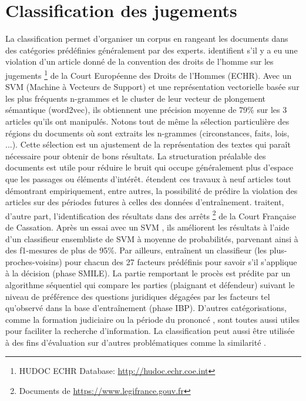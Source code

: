 \section{Classification des jugements}
La classification permet d'organiser un corpus en rangeant les documents dans des catégories prédéfinies généralement par des experts.  \cite{Aletras2016predictDecisionECHR} identifient s'il y a eu une violation d'un article donné de la convention des droits de l'homme sur les jugements \footnote{HUDOC ECHR Database: \url{http://hudoc.echr.coe.int}} de la Court Européenne des Droits de l'Hommes (ECHR). Avec un SVM (Machine à Vecteurs de Support) et une représentation vectorielle basée sur les plus fréquents n-grammes et le cluster de leur vecteur de plongement sémantique (word2vec), ils obtiennent une précision moyenne de 79\% sur les 3 articles qu'ils ont manipulés. Notons tout de même la sélection particulière des régions du documents où sont extraits les n-grammes (circonstances, faits, lois, ...). Cette sélection est un ajustement de la représentation des textes qui paraît nécessaire pour obtenir de bons résultats. La structuration préalable des documents est utile pour réduire le bruit qui occupe généralement plus d'espace que les passages ou éléments d'intérêt.  \citet{medvedeva2018echrCristalBall} étendent ces travaux à neuf articles tout démontrant empiriquement, entre autres, la possibilité de prédire la violation des articles sur des périodes futures à celles des données d'entraînement. \cite{sulea2017legalEnsSVM} traitent, d'autre part, l'identification des résultats dans des arrêts \footnote{Documents de \url{https://www.legifrance.gouv.fr}} de la Court Française de Cassation. Après un essai avec un SVM \citep{Sulea2017predictareadecision}, ils améliorent les résultats à l'aide d'un classifieur ensembliste de SVM à moyenne de probabilités, parvenant ainsi à des f1-mesures de plus de 95\%.  Par ailleurs, \cite{Ashley2009classifCases} entraînent un classifieur (les plus-proches-voisins) pour chacun des 27 facteurs prédéfinis pour savoir s'il s'applique à la décision (phase SMILE). La partie remportant le procès est prédite par un algorithme séquentiel qui compare les parties (plaignant et défendeur) suivant le niveau de préférence des questions juridiques dégagées par les facteurs tel qu'observé dans la base d'entraînement (phase IBP).  D'autres catégorisations, comme la formation judiciaire ou la période du prononcé \citep{Sulea2017predictareadecision,sulea2017legalEnsSVM}, sont toutes aussi utiles pour faciliter la recherche d'information. La classification peut aussi être utilisée à des fins d'évaluation sur d'autres problématiques comme la similarité \citep{ma2018wmdchinesecase}.

